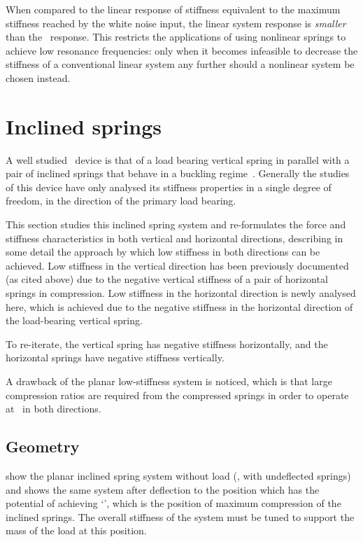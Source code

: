 When compared to the linear response of stiffness equivalent to the maximum
stiffness reached by the white noise input, the linear system response is
\emph{smaller} than the \qzs\ response. This restricts the applications of
using nonlinear springs to achieve low resonance frequencies: only when it
becomes infeasible to decrease the stiffness of a conventional linear system
any further should a nonlinear system be chosen instead.




\section{Inclined springs}

A well studied \qzs\ device is that of a load bearing vertical spring in
parallel with a pair of inclined springs that behave in a buckling
regime~\cite{molyneux1957,alabuzhev1989,carrella2006,carrella2007,carrella2008}.
Generally the studies of this device have only analysed its stiffness
properties in a single degree of freedom, in the direction of the primary load
bearing.

This section studies this inclined spring system and re-formulates the force
and stiffness characteristics in both vertical and horizontal directions,
describing in some detail the approach by which low stiffness in both
directions can be achieved. Low stiffness in the vertical direction has been
previously documented (as cited above) due to the negative vertical stiffness
of a pair of horizontal springs in compression. Low stiffness in the
horizontal direction is newly analysed here, which is achieved due to the
negative stiffness in the horizontal direction of the load-bearing vertical
spring.

To re-iterate, the vertical spring has negative stiffness horizontally, and
the horizontal springs have negative stiffness vertically.

A drawback of the planar low-stiffness system is noticed, which is that
large compression ratios are required from the compressed springs in order to
operate at \qzs\ in both directions.

\subsection{Geometry}

 show the planar inclined spring system without load (\ie,
with undeflected springs) and  shows the same system after
deflection to the position which has the potential of achieving `\qzs', which
is the position of maximum compression of the inclined springs. The overall
stiffness of the system must be tuned to support the mass of the load at this
position.

